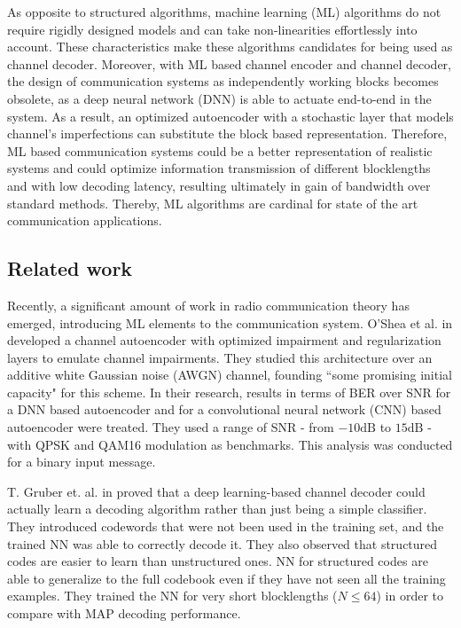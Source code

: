 \documentclass[conference]{IEEEtran}
\begin{document}
As opposite to structured algorithms, machine learning (ML) algorithms do not require rigidly designed models and can take non-linearities effortlessly into account. These characteristics make these algorithms candidates for being used as channel decoder. Moreover, with ML based channel encoder and channel decoder, the design of communication systems as independently working blocks becomes obsolete, as a deep neural network (DNN) is able to actuate end-to-end in the system. As a result, an optimized autoencoder with a stochastic layer that models channel's imperfections can substitute the block based representation. Therefore, ML based communication systems could be a better representation of realistic systems and could optimize information transmission of different blocklengths and with low decoding latency, resulting ultimately in gain of bandwidth over standard methods. Thereby, ML algorithms are cardinal for state of the art communication applications. 

\subsection{Related work}

Recently, a significant amount of work in radio communication theory has emerged, introducing ML elements to the communication system. O'Shea et al. in \cite{osheaautoencoder} developed a channel autoencoder with optimized impairment and regularization layers to emulate channel impairments. They studied this architecture over an additive white Gaussian noise (AWGN) channel, founding ``some promising initial capacity" for this scheme. In their research, results in terms of BER over SNR for a DNN based autoencoder and for a convolutional neural network (CNN) based autoencoder were treated. They used a range of SNR - from $-10 \text{dB}$ to $15 \text{dB}$ - with QPSK and QAM16 modulation as benchmarks. This analysis was conducted for a binary input message.

    
T. Gruber et. al. in \cite{2018} proved that a deep learning-based channel decoder could actually learn a decoding algorithm rather than just being a simple classifier. They introduced codewords that were not been used in the training set, and the trained NN was able to correctly decode it. They also observed that structured codes are easier to learn than unstructured ones. NN for structured codes are able to generalize to the full codebook even if they have not seen all the training examples. They trained the NN for very short blocklengths ($N \leq 64$) in order to compare with MAP decoding performance.
\end{document}
